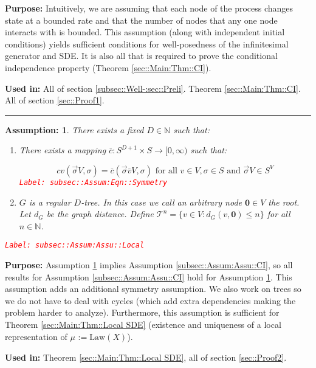 \documentclass[12pt]{article}
\newcommand{\mb}{\mathbb}
\newcommand{\mc}{\mathcal}
\newcommand{\ra}{\rightarrow}
\newcommand{\ov}{\overline}
\newcommand{\te}{\text}
\newcommand{\tr}{\textcolor{red}}
\newcommand{\labe}[1]{\tr{\texttt{Label: #1}}}
\newcommand{\purpose}{\textbf{Purpose: }}
\newcommand{\usein}{\textbf{Used in: }}
\newcommand{\lin}{\rule{\linewidth}{0.4 pt}}
\newcommand{\defeq}{:=}								%
\renewcommand{\root}{\mathbf{0}}				%
\renewcommand{\v}{v}							%
\renewcommand{\S}{S}							%
\newcommand{\s}{\sigma}							%
\newcommand{\sv}{\vec{\s}}						%
\newcommand{\X}{X}								%
\newcommand{\IGr}{c}							%
\newcommand{\cl}{\ov}							%
\newcommand{\degr}{D}							%
\newcommand{\IGrg}{\ov{c}}						%
\newcommand{\gdist}{d_G}						%
\newcommand{\tree}{\mc{T}}						%
\newcommand{\law}{\te{Law}}							%
\newcommand{\XState}[1]{\S^{#1}}				%
\newcommand{\m}[3]{\mu_{#2#1}^{#3}}						%
\newtheorem{assu}[thms]{Assumption: }
\begin{document}
\purpose Intuitively, we are assuming that each node of the process changes state at a bounded rate and that the number of nodes that any one node interacts with is bounded. This assumption (along with independent initial conditions) yields sufficient conditions for well-posedness of the infinitesimal generator and SDE. It is also all that is required to prove the conditional independence property (Theorem \ref{sec::Main:Thm::CI}). 

\usein All of section \ref{subsec::Well-:sec::Preli}. Theorem \ref{sec::Main:Thm::CI}. All of section \ref{sec::Proof1}.

\lin

\begin{assu}
There exists a fixed \(\degr\in \mb{N}\) such that:

\begin{enumerate}
\item There exists a mapping \(\IGrg: \S^{\degr+1} \times \S \ra [0,\infty)\) such that:

\begin{equation}
\IGr{\v}(\sv{}{ V},\s) = \IGrg(\sv{\cl{\v}}{ V},\s) \te{ for all } \v\in  V, \s\in \S\te{ and } \sv{}{ V} \in \S^ V
\label{subsec::Assum:Eqn::Symmetry}
\end{equation}
\labe{subsec::Assum:Eqn::Symmetry}

\item \(G\) is a regular \(\degr\)-tree. In this case we call an arbitrary node \(\root\in  V\) the root. Let \(\gdist\) be the graph distance. Define \(\tree^n = \{\v \in  V: \gdist(\v,\root) \leq n\}\) for all \(n\in \mb{N}\).
\end{enumerate}
\label{subsec::Assum:Assu::Local}\labe{subsec::Assum:Assu::Local}
\end{assu}

\purpose Assumption \ref{subsec::Assum:Assu::Local} implies Assumption \ref{subsec::Assum:Assu::CI}, so all results for Assumption \ref{subsec::Assum:Assu::CI} hold for Assumption \ref{subsec::Assum:Assu::Local}. This assumption adds an additional symmetry assumption. We also work on trees so we do not have to deal with cycles (which add extra dependencies making the problem harder to analyze). Furthermore, this assumption is sufficient for Theorem \ref{sec::Main:Thm::Local SDE} (existence and uniqueness of a local representation of \(\m{}{}{} \defeq \law(\X{}{})\)).

\usein Theorem \ref{sec::Main:Thm::Local SDE}, all of section \ref{sec::Proof2}.
\end{document}
